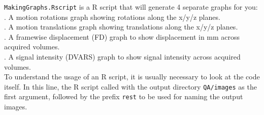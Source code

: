   \texttt{MakingGraphs.Rscript} is a R script that will generate 4 separate graphs for you: \\
	. A motion rotations graph showing rotations along the x/y/z planes.\\
	. A motion translations graph showing translations along the x/y/z planes.\\
	. A framewise displacement (FD) graph to show displacement in mm across acquired volumes.\\
	. A signal intensity (DVARS) graph to show signal intensity across acquired volumes.\\
	To understand the usage of an R script, it is usually necessary to look at the code itself. In this line, the R script called with the output directory \texttt{QA/images} as the first argument, followed by the prefix \texttt{rest} to be used for naming the output images.\\

